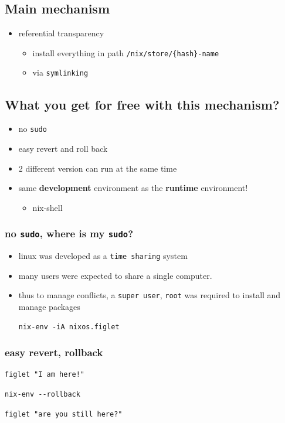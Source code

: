 \documentclass[11pt]{article}
\begin{document}
\subsection{Main mechanism}
\label{sec:orga6ea085}
\begin{itemize}
\item referential transparency
\begin{itemize}
\item install everything in path \texttt{/nix/store/\{hash\}-name}
\item via \texttt{symlinking}
\end{itemize}
\end{itemize}
\subsection{What you get for free with this mechanism?}
\label{sec:orgb489144}
\begin{itemize}
\item no \texttt{sudo}
\item easy revert and roll back
\item 2 different version can run at the same time
\item same \textbf{development} environment as the \textbf{runtime} environment!
\begin{itemize}
\item nix-shell
\end{itemize}
\end{itemize}
\subsubsection{no \texttt{sudo}, where is my \texttt{sudo}?}
\label{sec:org87caf5b}
\begin{itemize}
\item linux was developed as a \texttt{time sharing} system
\item many users were expected to share a single computer.
\item thus to manage conflicts, a \texttt{super user}, \texttt{root} was required to
install and manage packages
\begin{verbatim}
nix-env -iA nixos.figlet
\end{verbatim}
\end{itemize}
\subsubsection{easy revert, rollback}
\label{sec:org2e708e6}
\begin{verbatim}
figlet "I am here!"
\end{verbatim}
\begin{verbatim}
nix-env --rollback
\end{verbatim}
\begin{verbatim}
figlet "are you still here?"
\end{verbatim}
\end{document}
